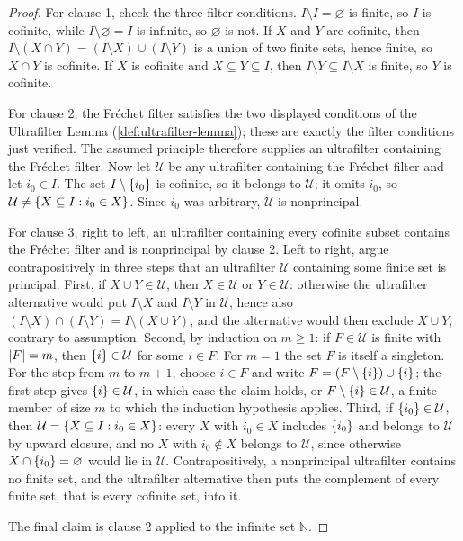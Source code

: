 \documentclass[11pt,oneside,openany]{book}
\theoremstyle{definition}
\theoremstyle{plain}
\theoremstyle{remark}
\DeclarePairedDelimiter{\set}{\lbrace}{\rbrace}
\DeclarePairedDelimiter{\abs}{\lvert}{\rvert}
\newcommand{\N}{\mathbb{N}}
\begin{document}
\begin{proof}
For clause 1, check the three filter conditions.  \(I\setminus
I=\varnothing\) is finite, so \(I\) is cofinite, while
\(I\setminus\varnothing=I\) is infinite, so \(\varnothing\) is not.  If
\(X\) and \(Y\) are cofinite, then
\(I\setminus(X\cap Y)=(I\setminus X)\cup(I\setminus Y)\) is a union of two
finite sets, hence finite, so \(X\cap Y\) is cofinite.  If \(X\) is
cofinite and \(X\subseteq Y\subseteq I\), then
\(I\setminus Y\subseteq I\setminus X\) is finite, so \(Y\) is cofinite.

For clause 2, the Fr\'echet filter satisfies the two displayed conditions
of the Ultrafilter Lemma (\cref{def:ultrafilter-lemma}); these are exactly
the filter conditions just verified.  The assumed principle therefore
supplies an ultrafilter containing the Fr\'echet filter.  Now let
\(\mathcal U\) be any ultrafilter containing the Fr\'echet filter and let
\(i_0\in I\).  The set \(I\setminus\set{i_0}\) is cofinite, so it belongs
to \(\mathcal U\); it omits \(i_0\), so
\(\mathcal U\ne\set{X\subseteq I:i_0\in X}\).  Since \(i_0\) was
arbitrary, \(\mathcal U\) is nonprincipal.

For clause 3, right to left, an ultrafilter containing every cofinite
subset contains the Fr\'echet filter and is nonprincipal by clause 2.
Left to right, argue contrapositively in three steps that an ultrafilter
\(\mathcal U\) containing some finite set is principal.  First, if
\(X\cup Y\in\mathcal U\), then \(X\in\mathcal U\) or \(Y\in\mathcal U\):
otherwise the ultrafilter alternative would put \(I\setminus X\) and
\(I\setminus Y\) in \(\mathcal U\), hence also
\((I\setminus X)\cap(I\setminus Y)=I\setminus(X\cup Y)\), and the
alternative would then exclude \(X\cup Y\), contrary to assumption.
Second, by induction on \(m\geq 1\): if \(F\in\mathcal U\) is finite with
\(\abs{F}=m\), then \(\set{i}\in\mathcal U\) for some \(i\in F\).  For
\(m=1\) the set \(F\) is itself a singleton.  For the step from \(m\) to
\(m+1\), choose \(i\in F\) and write
\(F=(F\setminus\set{i})\cup\set{i}\); the first step gives
\(\set{i}\in\mathcal U\), in which case the claim holds, or
\(F\setminus\set{i}\in\mathcal U\), a finite member of size \(m\) to which
the induction hypothesis applies.  Third, if \(\set{i_0}\in\mathcal U\),
then \(\mathcal U=\set{X\subseteq I:i_0\in X}\): every \(X\) with
\(i_0\in X\) includes \(\set{i_0}\) and belongs to \(\mathcal U\) by
upward closure, and no \(X\) with \(i_0\notin X\) belongs to
\(\mathcal U\), since otherwise \(X\cap\set{i_0}=\varnothing\) would lie
in \(\mathcal U\).  Contrapositively, a nonprincipal ultrafilter contains
no finite set, and the ultrafilter alternative then puts the complement of
every finite set, that is every cofinite set, into it.

The final claim is clause 2 applied to the infinite set \(\N\).
\end{proof}
\end{document}
